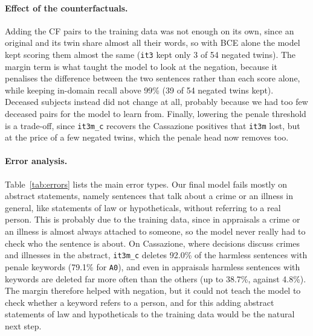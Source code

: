 \documentclass[11pt]{article}
\begin{document}
\paragraph{Effect of the counterfactuals.} Adding the CF pairs to the training data was not enough on its own, since an original and its twin share almost all their words, so with BCE alone the model kept scoring them almost the same (\texttt{it3} kept only 3 of 54 negated twins). The margin term is what taught the model to look at the negation, because it penalises the difference between the two sentences rather than each score alone, while keeping in-domain recall above 99\% (39 of 54 negated twins kept). Deceased subjects instead did not change at all, probably because we had too few deceased pairs for the model to learn from. Finally, lowering the penale threshold is a trade-off, since \texttt{it3m\_c} recovers the Cassazione positives that \texttt{it3m} lost, but at the price of a few negated twins, which the penale head now removes too.

\paragraph{Error analysis.} Table~\ref{tab:errors} lists the main error types. Our final model fails mostly on abstract statements, namely sentences that talk about a crime or an illness in general, like statements of law or hypotheticals, without referring to a real person. This is probably due to the training data, since in appraisals a crime or an illness is almost always attached to someone, so the model never really had to check who the sentence is about. On Cassazione, where decisions discuss crimes and illnesses in the abstract, \texttt{it3m\_c} deletes 92.0\% of the harmless sentences with penale keywords (79.1\% for \texttt{A0}), and even in appraisals harmless sentences with keywords are deleted far more often than the others (up to 38.7\%, against 4.8\%). The margin therefore helped with negation, but it could not teach the model to check whether a keyword refers to a person, and for this adding abstract statements of law and hypotheticals to the training data would be the natural next step.
\end{document}
